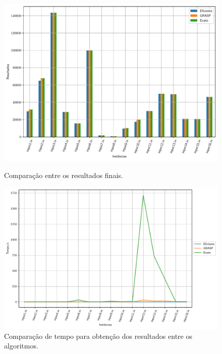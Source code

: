 \documentclass[a4paper, 12pt]{article}
\begin{document}
\begin{figure}[!htb]
    \centering
    \begin{minipage}{0.5\textwidth}
        \centering
        \includegraphics[width=\linewidth]{../imgs/final_compare.pdf}
        \caption{Comparação entre os resultados finais.}
        \label{final_compare}
    \end{minipage}%
    \begin{minipage}{0.5\textwidth}
        \centering
        \includegraphics[width=1\linewidth]{../imgs/time_final_cmp.pdf}
        \caption{Comparação de tempo para obtenção dos resultados entre os algoritmos.}
        \label{time_final_cmp}
    \end{minipage}
\end{figure}
\end{document}
